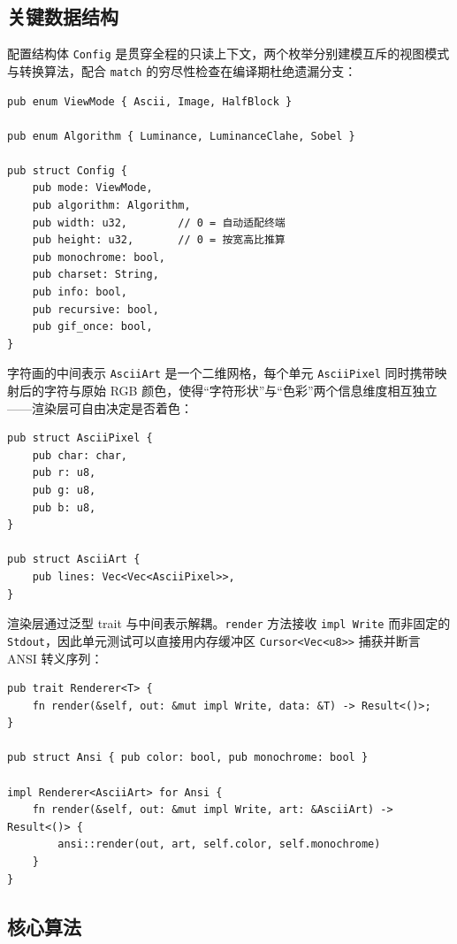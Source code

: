 \documentclass{SYSUReport}
\begin{document}
\subsection{关键数据结构}

配置结构体 \texttt{Config} 是贯穿全程的只读上下文，两个枚举分别建模互斥的视图模式与转换算法，配合 \texttt{match} 的穷尽性检查在编译期杜绝遗漏分支：

\begin{lstlisting}[caption={配置与模式枚举（config.rs / ascii/mod.rs）}]
pub enum ViewMode { Ascii, Image, HalfBlock }

pub enum Algorithm { Luminance, LuminanceClahe, Sobel }

pub struct Config {
    pub mode: ViewMode,
    pub algorithm: Algorithm,
    pub width: u32,        // 0 = 自动适配终端
    pub height: u32,       // 0 = 按宽高比推算
    pub monochrome: bool,
    pub charset: String,
    pub info: bool,
    pub recursive: bool,
    pub gif_once: bool,
}
\end{lstlisting}

字符画的中间表示 \texttt{AsciiArt} 是一个二维网格，每个单元 \texttt{AsciiPixel} 同时携带映射后的字符与原始 RGB 颜色，使得``字符形状''与``色彩''两个信息维度相互独立——渲染层可自由决定是否着色：

\begin{lstlisting}[caption={字符画中间表示（ascii/mod.rs）}]
pub struct AsciiPixel {
    pub char: char,
    pub r: u8,
    pub g: u8,
    pub b: u8,
}

pub struct AsciiArt {
    pub lines: Vec<Vec<AsciiPixel>>,
}
\end{lstlisting}

渲染层通过泛型 trait 与中间表示解耦。\texttt{render} 方法接收 \texttt{impl Write} 而非固定的 \texttt{Stdout}，因此单元测试可以直接用内存缓冲区 \texttt{Cursor<Vec<u8>>} 捕获并断言 ANSI 转义序列：

\begin{lstlisting}[caption={渲染抽象（render/mod.rs）}]
pub trait Renderer<T> {
    fn render(&self, out: &mut impl Write, data: &T) -> Result<()>;
}

pub struct Ansi { pub color: bool, pub monochrome: bool }

impl Renderer<AsciiArt> for Ansi {
    fn render(&self, out: &mut impl Write, art: &AsciiArt) -> Result<()> {
        ansi::render(out, art, self.color, self.monochrome)
    }
}
\end{lstlisting}

\subsection{核心算法}
\end{document}
